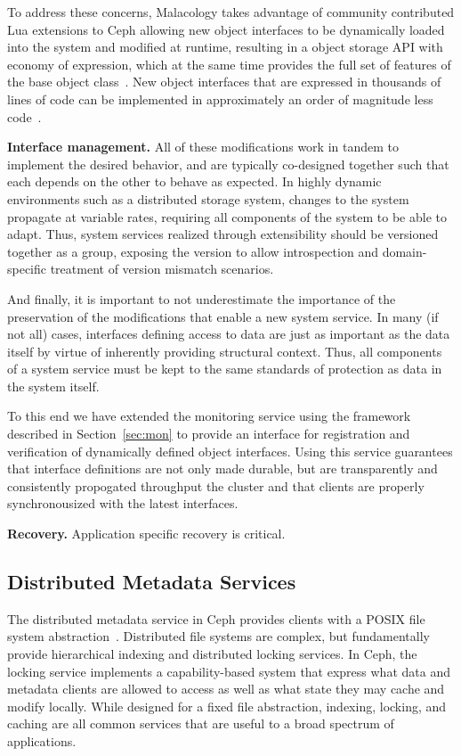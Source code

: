 \documentclass[10pt,twocolumn]{article}
\begin{document}
To address these concerns, Malacology takes advantage of community contributed
Lua extensions to Ceph allowing new object interfaces to be dynamically loaded
into the system and modified at runtime, resulting in a object storage API
with economy of expression, which at the same time provides the full set of
features of the base object class~\cite{bdmc}. New object interfaces that are
expressed in thousands of lines of code can be implemented in approximately an
order of magnitude less code~\cite{geambasu_comet_2010}.

{\bf Interface management.} All of these modifications work in tandem to
implement the desired behavior, and are typically co-designed together such
that each depends on the other to behave as expected. In highly dynamic
environments such as a distributed storage system, changes to the system
propagate at variable rates, requiring all components of the system to be able
to adapt. Thus, system services realized through extensibility should be
versioned together as a group, exposing the version to allow introspection and
domain-specific treatment of version mismatch scenarios.

And finally, it is important to not underestimate the importance of the
preservation of the modifications that enable a new system service. In many
(if not all) cases, interfaces defining access to data are just as important
as the data itself by virtue of inherently providing structural context. Thus,
all components of a system service must be kept to the same standards of
protection as data in the system itself.

To this end we have extended the monitoring service using the framework
described in Section~\ref{sec:mon} to provide an interface for registration
and verification of dynamically defined object interfaces. Using this service
guarantees that interface definitions are not only made durable, but are
transparently and consistently propogated throughput the cluster and that
clients are properly synchronousized with the latest interfaces.

{\bf Recovery.} Application specific recovery is critical.

\subsection{Distributed Metadata Services}
\label{malacology:mds}

The distributed metadata service in Ceph provides clients with a POSIX file
system abstraction~\cite{cephfs}. Distributed file systems are complex, but
fundamentally provide hierarchical indexing and distributed locking services.
In Ceph, the locking service implements a capability-based system that express
what data and metadata clients are allowed to access as well as what state
they may cache and modify locally. While designed for a fixed file
abstraction, indexing, locking, and caching are all common services that are
useful to a broad spectrum of applications.
\end{document}
